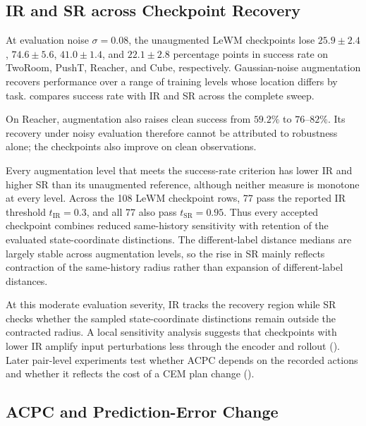 \documentclass[10pt]{article}
\begin{document}
\subsection{IR and SR across Checkpoint Recovery}\label{sec:exp-gaussian-panel}

At evaluation noise $\sigma=0.08$, the unaugmented LeWM checkpoints lose
$25.9\pm2.4$, $74.6\pm5.6$, $41.0\pm1.4$, and $22.1\pm2.8$ percentage points
in success rate on TwoRoom, PushT, Reacher, and Cube, respectively.
Gaussian-noise augmentation recovers performance over a range of training
levels whose location differs by task. 
compares success
rate with IR and SR across the complete sweep.

On Reacher, augmentation also raises clean success from $59.2\%$ to
$76$--$82\%$. Its recovery under noisy evaluation therefore cannot be
attributed to robustness alone; the checkpoints also improve on clean
observations.

Every augmentation level that meets the success-rate criterion has lower IR
and higher SR than its unaugmented reference, although neither measure is
monotone at every level. Across the 108 LeWM checkpoint rows, 77 pass the
reported IR threshold $t_{\mathrm{IR}}=0.3$, and all 77 also pass
$t_{\mathrm{SR}}=0.95$. Thus every accepted checkpoint combines reduced same-history sensitivity with retention
of the evaluated state-coordinate distinctions. The different-label distance
medians are largely stable across augmentation levels, so the rise in SR
mainly reflects contraction of the same-history radius rather than expansion
of different-label distances.

At this moderate evaluation severity, IR tracks the recovery region while SR
checks whether the sampled
state-coordinate distinctions remain outside the contracted radius. A
local sensitivity analysis suggests that checkpoints with lower IR amplify
input perturbations less through the encoder and rollout
(). Later pair-level experiments test
whether ACPC depends on the recorded actions and whether it reflects the cost
of a CEM plan change
().
\FloatBarrier



\subsection{ACPC and Prediction-Error Change}\label{sec:exp-target-aligned}
\end{document}

